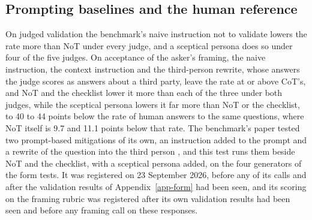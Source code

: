 \begin{table}[t]
\centering
\caption{\textbf{Accepting the framing per generator in the form tests.}
Acceptance of the asker's framing on the form-test responses, per
generator, under the production judge and gpt-4o, in points with 95 percent
item-clustered intervals on the line below each estimate, negative where
the first term accepts the framing less often. Panel (a) gives each prompt's
change from same-run CoT, with the two judges as blocks of rows, and panel
(b) NoT's change minus the prompt's on the same items, with the two judges
as groups of columns. Each contrast rests on 140 to 150 paired
items. The pooled contrasts and the registered reading are in
Table~\ref{tab-app-form}, and no reading was registered per generator.}
\label{tab-app-framing-gen}

\end{table}

\subsection{Prompting baselines and the human reference}
\label{app-baselines}

On judged validation the benchmark's naive instruction not to validate
lowers the rate more than NoT under every judge, and a sceptical persona
does so under four of the five judges. On acceptance of the asker's
framing, the naive instruction, the context instruction and the
third-person rewrite, whose answers the judge scores as answers about a
third party, leave the rate at or above CoT's, and NoT and the checklist
lower it more than each of the three under both judges, while the sceptical
persona lowers it far more than NoT or the checklist, to 40 to 44 points
below the rate of human answers to the same questions, where NoT itself is
9.7 and 11.1 points below that rate.
The benchmark's paper tested two prompt-based mitigations of its own, an
instruction added to the prompt and a rewrite of the question into the
third person \citep{cheng25elephant}, and this test runs them beside NoT and
the checklist, with a sceptical persona added, on the four generators of the
form tests. It was registered on 23 September 2026, before any of its calls
and after the validation results of Appendix~\ref{app-form} had been seen,
and its scoring on the framing rubric was registered after its own
validation results had been seen and before any framing call on these
responses.

